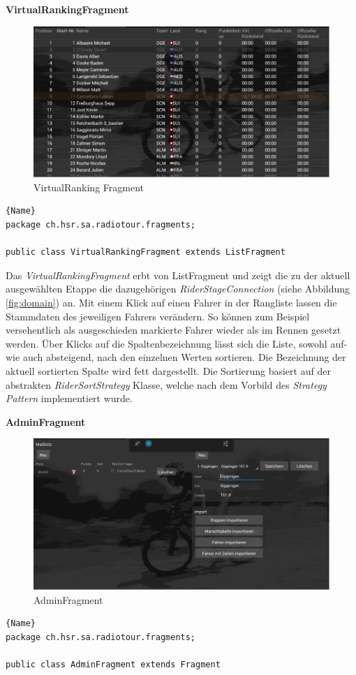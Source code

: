 \textbf{VirtualRankingFragment}

\begin{figure}[h!]
\caption{VirtualRanking Fragment}
\label{fig:virtualrankingfragment}
\centering
\includegraphics[scale=0.8]{07anhang/images/dev_virtual.png}
\end{figure}

\begin{lstlisting}{Name}
package ch.hsr.sa.radiotour.fragments;

public class VirtualRankingFragment extends ListFragment
\end{lstlisting}

Das \textit{VirtualRankingFragment} erbt von ListFragment und zeigt die zu der aktuell ausgewählten Etappe die dazugehörigen \textit{RiderStageConnection} (siehe Abbildung \ref{fig:domain}) an. Mit einem Klick auf einen Fahrer in der Rangliste lassen die Stammdaten des jeweiligen Fahrers verändern. So können zum Beispiel versehentlich als ausgeschieden markierte Fahrer wieder als im Rennen gesetzt werden. Über Klicks auf die  Spaltenbezeichnung lässt sich die Liste, sowohl auf- wie auch absteigend, nach den einzelnen Werten sortieren. Die Bezeichnung der aktuell sortierten Spalte wird fett dargestellt. Die Sortierung basiert auf der abstrakten \textit{RiderSortStrategy} Klasse, welche nach dem Vorbild des \textit{Strategy Pattern} implementiert wurde. 

\textbf{AdminFragment}

\begin{figure}[h!]
\caption{AdminFragment}
\label{fig:adminfragment}
\centering
\includegraphics[scale=0.8]{07anhang/images/dev_adminfragment.png}
\end{figure}
\begin{lstlisting}{Name}
package ch.hsr.sa.radiotour.fragments;

public class AdminFragment extends Fragment
\end{lstlisting}


